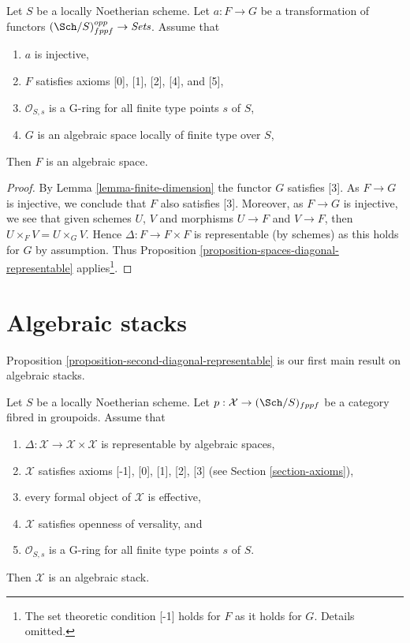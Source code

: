 \begin{lemma}
\label{lemma-monomorphism}
Let $S$ be a locally Noetherian scheme. Let $a : F \to G$ be a transformation
of functors $(\Sch/S)_{fppf}^{opp} \to \textit{Sets}$.
Assume that
\begin{enumerate}
\item $a$ is injective,
\item $F$ satisfies axioms [0], [1], [2], [4], and [5],
\item $\mathcal{O}_{S, s}$ is a G-ring for all finite type points $s$ of $S$,
\item $G$ is an algebraic space locally of finite type over $S$,
\end{enumerate}
Then $F$ is an algebraic space.
\end{lemma}

\begin{proof}
By Lemma \ref{lemma-finite-dimension} the functor $G$ satisfies [3].
As $F \to G$ is injective, we conclude that $F$ also satisfies [3].
Moreover, as $F \to G$ is injective, we see that given schemes
$U$, $V$ and morphisms $U \to F$ and $V \to F$, then
$U \times_F V = U \times_G V$. Hence $\Delta : F \to F \times F$ is
representable (by schemes) as this holds for $G$ by assumption.
Thus Proposition \ref{proposition-spaces-diagonal-representable}
applies\footnote{The set
theoretic condition [-1] holds for $F$ as it holds for $G$. Details
omitted.}.
\end{proof}












\section{Algebraic stacks}
\label{section-algebraic-stacks}

\noindent
Proposition \ref{proposition-second-diagonal-representable} is our first
main result on algebraic stacks.

\begin{lemma}
\label{lemma-diagonal-representable}
Let $S$ be a locally Noetherian scheme. Let
$p : \mathcal{X} \to (\Sch/S)_{fppf}$ be a category fibred in groupoids.
Assume that
\begin{enumerate}
\item $\Delta : \mathcal{X} \to \mathcal{X} \times \mathcal{X}$
is representable by algebraic spaces,
\item $\mathcal{X}$ satisfies axioms [-1], [0], [1], [2], [3] (see
Section \ref{section-axioms}),
\item every formal object of $\mathcal{X}$ is effective,
\item $\mathcal{X}$ satisfies openness of versality, and
\item $\mathcal{O}_{S, s}$ is a G-ring for all finite type points $s$ of $S$.
\end{enumerate}
Then $\mathcal{X}$ is an algebraic stack.
\end{lemma}

